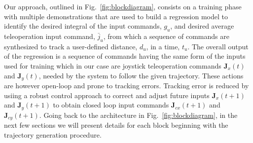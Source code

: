 \documentclass[letterpaper, 10 pt, conference]{ieeeconf}  %
\begin{document}
Our approach, outlined in Fig.~\ref{fig:blockdiagram}, consists on a training phase with multiple demonstrations that are used to build a regression model to identify the desired integral of the input commands, $g_u$, and desired average teleoperation input command, $\bar{j}_u$, from which a sequence of commands are synthesized to track a user-defined distance, $d_u$, in a time, $t_u$. The overall output of the regression is a sequence of commands having the same form of the inputs used for training which in our case are joystick teleoperation commands $\mathbf{J}_x(t)$ and $\mathbf{J}_y(t)$, needed by the system to follow the given trajectory. These actions are however open-loop and prone to tracking errors. Tracking error is reduced by usiing a robust control approach to correct and adjust future inputs $\mathbf{J}_x(t+1)$ and $\mathbf{J}_y(t+1)$ to obtain closed loop input commands $\mathbf{J}_{cx}(t+1)$ and $\mathbf{J}_{cy}(t+1)$. 
Going back to the architecture in Fig.~\ref{fig:blockdiagram}, in the next few sections we will present details for each block beginning with the trajectory generation procedure.
%
 

\end{document}
